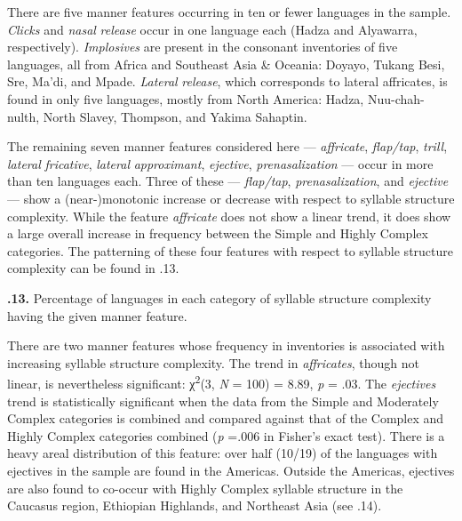   There are five manner features occurring in ten or fewer languages in the sample. \textit{Clicks} and \textit{nasal} \textit{release} occur in one language each (Hadza and Alyawarra, respectively). \textit{Implosives} are present in the consonant inventories of five languages, all from Africa and Southeast Asia \& Oceania: Doyayo, Tukang Besi, Sre, Ma’di, and Mpade. \textit{Lateral} \textit{release}, which corresponds to lateral affricates, is found in only five languages, mostly from North America: Hadza, Nuu-chah-nulth, North Slavey, Thompson, and Yakima Sahaptin.



  The remaining seven manner features considered here — \textit{affricate}, \textit{flap/tap}, \textit{trill}, \textit{lateral} \textit{fricative}, \textit{lateral} \textit{approximant}, \textit{ejective}, \textit{prenasalization} — occur in more than ten languages each. Three of these —  \textit{flap/tap}, \textit{prenasalization}, and \textit{ejective} — show a (near-)monotonic increase or decrease with respect to syllable structure complexity. While the feature \textit{affricate} does not show a linear trend, it does show a large overall increase in frequency between the Simple and Highly Complex categories. The patterning of these four features with respect to syllable structure complexity can be found in .13.





\textbf{.13.} Percentage of languages in each category of syllable structure complexity having the given manner feature.



  There are two manner features whose frequency in inventories is associated with increasing syllable structure complexity. The trend in \textit{affricates}, though not linear, is nevertheless significant: χ\textsuperscript{2}(3, \textit{N} = 100) = 8.89, \textit{p} = .03. The \textit{ejectives} trend is statistically significant when the data from the Simple and Moderately Complex categories is combined and compared against that of the Complex and Highly Complex categories combined (\textit{p} =.006 in Fisher’s exact test). There is a heavy areal distribution of this feature: over half (10/19) of the languages with ejectives in the sample are found in the Americas. Outside the Americas, ejectives are also found to co-occur with Highly Complex syllable structure in the Caucasus region, Ethiopian Highlands, and Northeast Asia (see .14).



